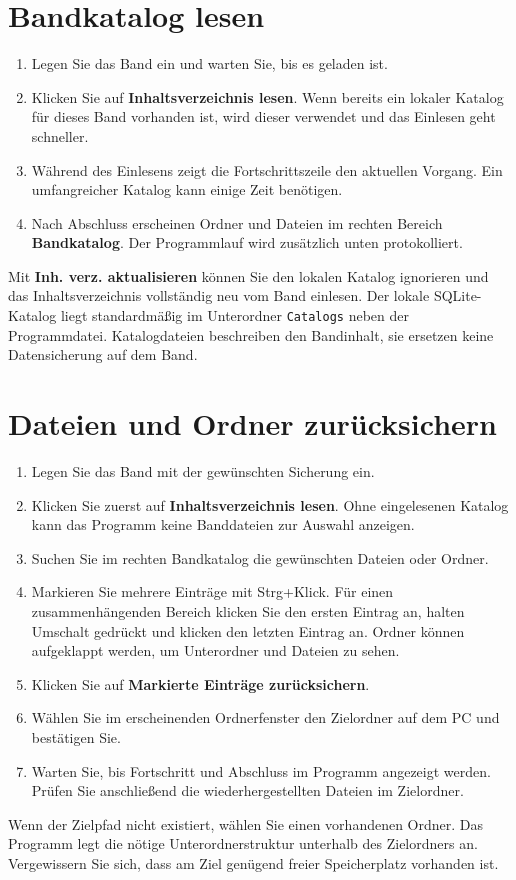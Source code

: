 \documentclass[11pt,a4paper]{article}
\begin{document}
\section{Bandkatalog lesen}
\begin{enumerate}
\item Legen Sie das Band ein und warten Sie, bis es geladen ist.
\item Klicken Sie auf \textbf{Inhaltsverzeichnis lesen}. Wenn bereits ein lokaler Katalog für dieses Band vorhanden ist, wird dieser verwendet und das Einlesen geht schneller.
\item Während des Einlesens zeigt die Fortschrittszeile den aktuellen Vorgang. Ein umfangreicher Katalog kann einige Zeit benötigen.
\item Nach Abschluss erscheinen Ordner und Dateien im rechten Bereich \textbf{Bandkatalog}. Der Programmlauf wird zusätzlich unten protokolliert.
\end{enumerate}
Mit \textbf{Inh. verz. aktualisieren} können Sie den lokalen Katalog ignorieren und das Inhaltsverzeichnis vollständig neu vom Band einlesen. Der lokale SQLite-Katalog liegt standardmäßig im Unterordner \texttt{Catalogs} neben der Programmdatei. Katalogdateien beschreiben den Bandinhalt, sie ersetzen keine Datensicherung auf dem Band.

\section{Dateien und Ordner zurücksichern}
\begin{enumerate}
\item Legen Sie das Band mit der gewünschten Sicherung ein.
\item Klicken Sie zuerst auf \textbf{Inhaltsverzeichnis lesen}. Ohne eingelesenen Katalog kann das Programm keine Banddateien zur Auswahl anzeigen.
\item Suchen Sie im rechten Bandkatalog die gewünschten Dateien oder Ordner.
\item Markieren Sie mehrere Einträge mit Strg+Klick. Für einen zusammenhängenden Bereich klicken Sie den ersten Eintrag an, halten Umschalt gedrückt und klicken den letzten Eintrag an. Ordner können aufgeklappt werden, um Unterordner und Dateien zu sehen.
\item Klicken Sie auf \textbf{Markierte Einträge zurücksichern}.
\item Wählen Sie im erscheinenden Ordnerfenster den Zielordner auf dem PC und bestätigen Sie.
\item Warten Sie, bis Fortschritt und Abschluss im Programm angezeigt werden. Prüfen Sie anschließend die wiederhergestellten Dateien im Zielordner.
\end{enumerate}
Wenn der Zielpfad nicht existiert, wählen Sie einen vorhandenen Ordner. Das Programm legt die nötige Unterordnerstruktur unterhalb des Zielordners an. Vergewissern Sie sich, dass am Ziel genügend freier Speicherplatz vorhanden ist.
\end{document}
